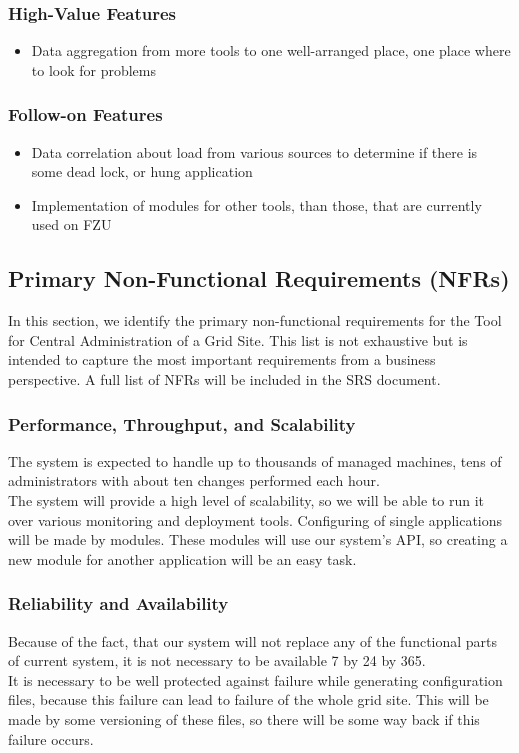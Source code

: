 \documentclass[12pt]{article}
\begin{document}
\subsubsection{High-Value Features}
\begin{itemize}
	\item Data aggregation from more tools to one well-arranged place, one place where to look for problems
\end{itemize}

\subsubsection{Follow-on Features}
\begin{itemize}
	\item Data correlation about load from various sources to determine if there is some dead lock, or hung application
	\item Implementation of modules for other tools, than those, that are currently used on FZU
\end{itemize}

\subsection{Primary Non-Functional Requirements (NFRs)}
In this section, we identify the primary non-functional requirements for the Tool for Central Administration of a Grid Site. This 
list is not exhaustive but is intended to capture the most important requirements from a business perspective. A full list of NFRs 
will be included in the SRS document.

\subsubsection{Performance, Throughput, and Scalability}
The system is expected to handle up to thousands of managed machines, tens of administrators with about ten changes performed each hour.\\
The system will provide a high level of scalability, so we will be able to run it over various monitoring and deployment tools. 
Configuring of single applications will be made by modules. These modules will use our system's API, so creating a new module for 
another application will be an easy task.

\subsubsection{Reliability and Availability}
Because of the fact, that our system will not replace any of the functional parts of current system, it is not necessary to be 
available 7 by 24 by 365.\\
It is necessary to be well protected against failure while generating configuration files, because this failure can lead to failure 
of the whole grid site. This will be made by some versioning of these files, so there will be some way back if this failure occurs.
\end{document}
